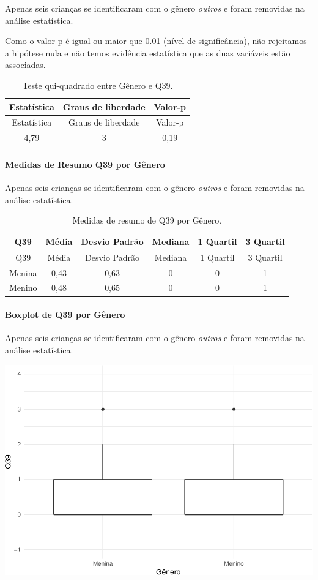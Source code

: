 \documentclass[]{article}
\let\oldparagraph\paragraph
\renewcommand{\paragraph}[1]{\oldparagraph{#1}\mbox{}}
\begin{document}
Apenas seis crianças se identificaram com o gênero \emph{outros} e foram removidas na análise estatística.

Como o valor-p é igual ou maior que 0.01 (nível de significância), não rejeitamos a hipótese nula e não temos evidência estatística que as duas variáveis estão associadas.

\begin{longtable}[]{@{}ccc@{}}
\caption{\label{tab:unnamed-chunk-1500}Teste qui-quadrado entre Gênero e Q39.}\tabularnewline
\toprule
Estatística & Graus de liberdade & Valor-p\tabularnewline
\midrule
\endfirsthead
\toprule
Estatística & Graus de liberdade & Valor-p\tabularnewline
\midrule
\endhead
4,79 & 3 & 0,19\tabularnewline
\bottomrule
\end{longtable}

\cleardoublepage

\hypertarget{medidas-de-resumo-q39-por-guxeanero}{%
\paragraph{Medidas de Resumo Q39 por Gênero}\label{medidas-de-resumo-q39-por-guxeanero}}

Apenas seis crianças se identificaram com o gênero \emph{outros} e foram removidas na análise estatística.

\begin{longtable}[]{@{}cccccc@{}}
\caption{\label{tab:unnamed-chunk-1501}Medidas de resumo de Q39 por Gênero.}\tabularnewline
\toprule
Q39 & Média & Desvio Padrão & Mediana & 1 Quartil & 3 Quartil\tabularnewline
\midrule
\endfirsthead
\toprule
Q39 & Média & Desvio Padrão & Mediana & 1 Quartil & 3 Quartil\tabularnewline
\midrule
\endhead
Menina & 0,43 & 0,63 & 0 & 0 & 1\tabularnewline
Menino & 0,48 & 0,65 & 0 & 0 & 1\tabularnewline
\bottomrule
\end{longtable}

\hypertarget{boxplot-de-q39-por-guxeanero}{%
\paragraph{Boxplot de Q39 por Gênero}\label{boxplot-de-q39-por-guxeanero}}

Apenas seis crianças se identificaram com o gênero \emph{outros} e foram removidas na análise estatística.

\begin{center}\includegraphics[width=0.75\linewidth]{relatorio_covid19_files/figure-latex/unnamed-chunk-1502-1} \end{center}
\end{document}
